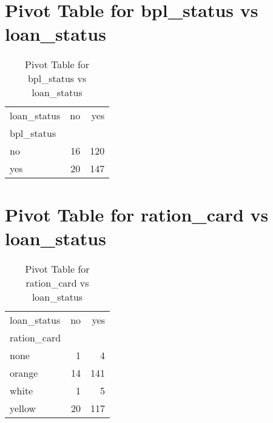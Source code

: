\documentclass{article}
\begin{document}
\section{Pivot Table for bpl_status vs loan_status}
\begin{table}
\caption{Pivot Table for bpl_status vs loan_status}
\label{tab:bpl_status_loan_status}
\begin{tabular}{lrr}
\toprule
loan_status & no & yes \\
bpl_status &  &  \\
\midrule
no & 16 & 120 \\
yes & 20 & 147 \\
\bottomrule
\end{tabular}
\end{table}

\section{Pivot Table for ration_card vs loan_status}
\begin{table}
\caption{Pivot Table for ration_card vs loan_status}
\label{tab:ration_card_loan_status}
\begin{tabular}{lrr}
\toprule
loan_status & no & yes \\
ration_card &  &  \\
\midrule
none & 1 & 4 \\
orange & 14 & 141 \\
white & 1 & 5 \\
yellow & 20 & 117 \\
\bottomrule
\end{tabular}
\end{table}
\end{document}

